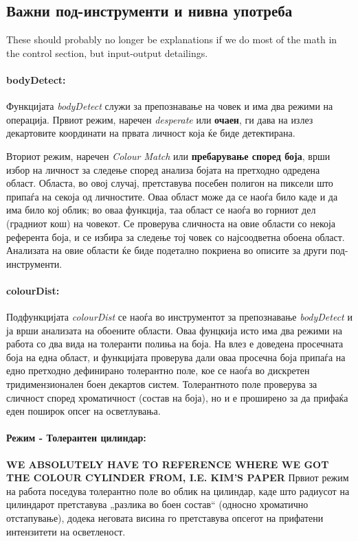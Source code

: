 \documentclass[12pt]{article}
\begin{document}
  \subsection{Важни под-инструменти и нивна употреба}
    These should probably no longer be explanations if we do most of the math in the control section, but input-output detailings.
    \paragraph{bodyDetect:\\}
      Функцијата \textit{bodyDetect} служи за препознавање на човек и има два режими на операција. Првиот режим, наречен \textit{desperate} или \textbf{очаен}, ги дава на излез декартовите координати на првата личност која ќе биде детектирана.

      Вториот режим, наречен \textit{Colour Match} или \textbf{пребарување според боја}, врши избор на личност за следење според анализа бојата на претходно одредена област. Областа, во овој случај, претставува посебен полигон на пиксели што припаѓа на секоја од личностите. Оваа област може да се наоѓа било каде и да има било кој облик; во оваа функција, таа област се наоѓа во горниот дел (градниот кош) на човекот. Се проверува сличноста на овие области со некоја референта боја, и се избира за следење тој човек со најсоодветна обоена област. Анализата на овие области ќе биде подетално покриена во описите за други под-инструменти.

    \paragraph{colourDist:\\}

      Подфункцијата \textit{colourDist} се наоѓа во инструментот за препознавање \textit{bodyDetect} и ја врши анализата на обоените области. Оваа фунцкија исто има два режими на работа со два вида на толеранти полиња на боја. На влез е доведена просечната боја на една област, и функцијата проверува дали оваа просечна боја припаѓа на едно претходно дефинирано толерантно поле, кое се наоѓа во дискретен тридимензионален боен декартов систем. Толерантното поле проверува за сличност според хроматичност (состав на боја), но и е проширено за да прифаќа еден поширок опсег на осветлувања.

      \paragraph{Режим - Толерантен цилиндар:\\}
        \textbf{WE ABSOLUTELY HAVE TO REFERENCE WHERE WE GOT THE COLOUR CYLINDER FROM, I.E. KIM'S PAPER}
        Првиот режим на работа поседува толерантно поле во облик на цилиндар, каде што радиусот на цилиндарот претставува „разлика во боен состав“ (односно хроматично отстапување), додека неговата висина го претставува опсегот на прифатени интензитети на осветленост.
\end{document}
